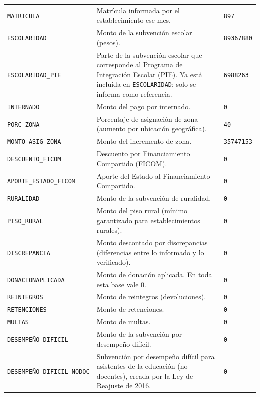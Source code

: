 \documentclass[10.5pt]{article}
\begin{document}
\begin{xltabular}{\linewidth}{@{}p{4.5cm} >{\raggedright\arraybackslash}X p{3.4cm}@{}}
\texttt{MATRICULA} & Matrícula informada por el establecimiento ese mes. & \texttt{897} \\
\texttt{ESCOLARIDAD} & Monto de la subvención escolar (pesos). & \texttt{89367880} \\
\texttt{ESCOLARIDAD\_\allowbreak{}PIE} & Parte de la subvención escolar que corresponde al Programa de Integración Escolar (PIE). Ya está incluida en \texttt{ESCOLARIDAD}; solo se informa como referencia. & \texttt{6988263} \\
\texttt{INTERNADO} & Monto del pago por internado. & \texttt{0} \\
\texttt{PORC\_\allowbreak{}ZONA} & Porcentaje de asignación de zona (aumento por ubicación geográfica). & \texttt{40} \\
\texttt{MONTO\_\allowbreak{}ASIG\_\allowbreak{}ZONA} & Monto del incremento de zona. & \texttt{35747153} \\
\texttt{DESCUENTO\_\allowbreak{}FICOM} & Descuento por Financiamiento Compartido (FICOM). & \texttt{0} \\
\texttt{APORTE\_\allowbreak{}ESTADO\_\allowbreak{}FICOM} & Aporte del Estado al Financiamiento Compartido. & \texttt{0} \\
\texttt{RURALIDAD} & Monto de la subvención de ruralidad. & \texttt{0} \\
\texttt{PISO\_\allowbreak{}RURAL} & Monto del piso rural (mínimo garantizado para establecimientos rurales). & \texttt{0} \\
\texttt{DISCREPANCIA} & Monto descontado por discrepancias (diferencias entre lo informado y lo verificado). & \texttt{0} \\
\texttt{DONACIONAPLICADA} & Monto de donación aplicada. En toda esta base vale 0. & \texttt{0} \\
\texttt{REINTEGROS} & Monto de reintegros (devoluciones). & \texttt{0} \\
\texttt{RETENCIONES} & Monto de retenciones. & \texttt{0} \\
\texttt{MULTAS} & Monto de multas. & \texttt{0} \\
\texttt{DESEMPEÑO\_\allowbreak{}DIFICIL} & Monto de la subvención por desempeño difícil. & \texttt{0} \\
\texttt{DESEMPEÑO\_\allowbreak{}DIFICIL\_\allowbreak{}NODOC} & Subvención por desempeño difícil para asistentes de la educación (no docentes), creada por la Ley de Reajuste de 2016. & \texttt{0} \\

\end{xltabular}
\end{document}
